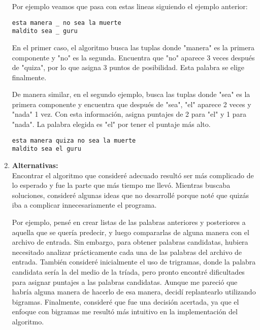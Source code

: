 \documentclass{article}
\begin{document}
\begin{enumerate}
    Por ejemplo veamos que pasa con estas lineas siguiendo el ejemplo anterior:
    \begin{verbatim}
esta manera _ no sea la muerte
maldito sea _ guru
    \end{verbatim}
    En el primer caso, el algoritmo busca las tuplas donde "manera" es la primera componente y "no"
     es la segunda. Encuentra que "no" aparece 3 veces después de "quiza", por lo
      que asigna 3 puntos de posibilidad. Esta palabra se elige finalmente.
      
      De manera similar, en el segundo ejemplo, busca las tuplas donde "sea" es la primera componente
       y encuentra que después de "sea", "el" aparece 2 veces y "nada" 1 vez. Con esta información, asigna
        puntajes de 2 para "el" y 1 para "nada". La palabra elegida es "el" por tener el puntaje más alto.


    \begin{verbatim}
esta manera quiza no sea la muerte
maldito sea el guru
    \end{verbatim}

    \item \textbf{Alternativas:} \\
    Encontrar el algoritmo que consideré adecuado resultó ser más complicado de lo esperado y fue la parte que más
     tiempo me llevó. Mientras buscaba soluciones, consideré algunas ideas que no desarrollé porque
     noté que quizás iba a complicar innecesariamente el programa.

    Por ejemplo, pensé en crear listas de las palabras anteriores y posteriores a aquella que se 
    quería predecir, y luego compararlas de 
    alguna manera con el archivo de entrada. Sin embargo, para obtener palabras candidatas, hubiera necesitado 
    analizar prácticamente cada una de las palabras del archivo de entrada. También consideré inicialmente el 
    uso de trigramas, donde la palabra candidata sería la del medio de la tríada, pero pronto encontré 
    dificultades para asignar puntajes a las palabras candidatas. Aunque me pareció que habría
    alguna manera de hacerlo de esa manera, decidí replantearlo utilizando bigramas.
    Finalmente, consideré que fue una decisión acertada, ya que el 
    enfoque con bigramas me resultó más intuitivo en la implementación del algoritmo.
\end{enumerate}
\end{document}
